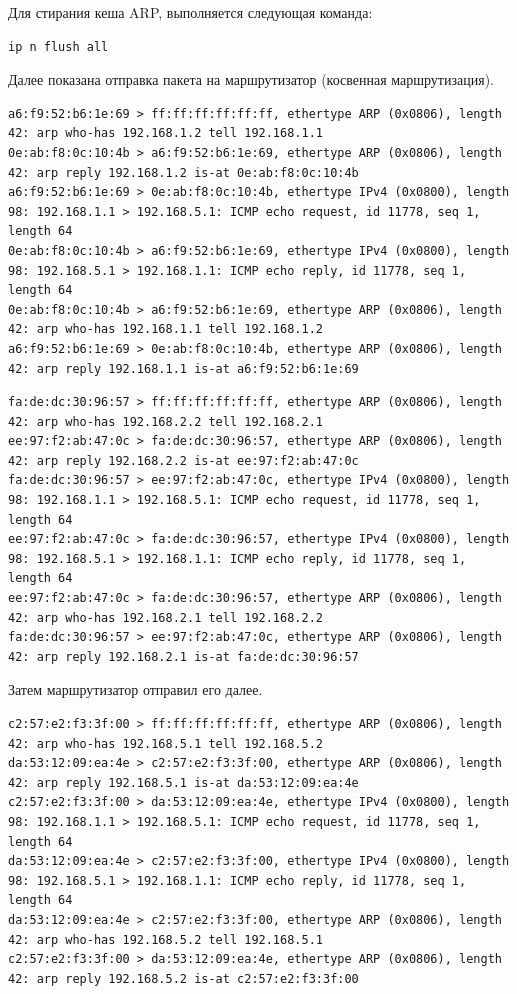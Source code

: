 \documentclass[a4paper,12pt]{article}
\begin{document}
Для стирания кеша ARP, выполняется следующая команда: 
\begin{Verbatim}
ip n flush all
\end{Verbatim}

Далее показана отправка пакета на маршрутизатор (косвенная маршрутизация). 

\begin{Verbatim}
a6:f9:52:b6:1e:69 > ff:ff:ff:ff:ff:ff, ethertype ARP (0x0806), length 42: arp who-has 192.168.1.2 tell 192.168.1.1
0e:ab:f8:0c:10:4b > a6:f9:52:b6:1e:69, ethertype ARP (0x0806), length 42: arp reply 192.168.1.2 is-at 0e:ab:f8:0c:10:4b
a6:f9:52:b6:1e:69 > 0e:ab:f8:0c:10:4b, ethertype IPv4 (0x0800), length 98: 192.168.1.1 > 192.168.5.1: ICMP echo request, id 11778, seq 1, length 64
0e:ab:f8:0c:10:4b > a6:f9:52:b6:1e:69, ethertype IPv4 (0x0800), length 98: 192.168.5.1 > 192.168.1.1: ICMP echo reply, id 11778, seq 1, length 64
0e:ab:f8:0c:10:4b > a6:f9:52:b6:1e:69, ethertype ARP (0x0806), length 42: arp who-has 192.168.1.1 tell 192.168.1.2
a6:f9:52:b6:1e:69 > 0e:ab:f8:0c:10:4b, ethertype ARP (0x0806), length 42: arp reply 192.168.1.1 is-at a6:f9:52:b6:1e:69
\end{Verbatim}

\begin{Verbatim}
fa:de:dc:30:96:57 > ff:ff:ff:ff:ff:ff, ethertype ARP (0x0806), length 42: arp who-has 192.168.2.2 tell 192.168.2.1
ee:97:f2:ab:47:0c > fa:de:dc:30:96:57, ethertype ARP (0x0806), length 42: arp reply 192.168.2.2 is-at ee:97:f2:ab:47:0c
fa:de:dc:30:96:57 > ee:97:f2:ab:47:0c, ethertype IPv4 (0x0800), length 98: 192.168.1.1 > 192.168.5.1: ICMP echo request, id 11778, seq 1, length 64
ee:97:f2:ab:47:0c > fa:de:dc:30:96:57, ethertype IPv4 (0x0800), length 98: 192.168.5.1 > 192.168.1.1: ICMP echo reply, id 11778, seq 1, length 64
ee:97:f2:ab:47:0c > fa:de:dc:30:96:57, ethertype ARP (0x0806), length 42: arp who-has 192.168.2.1 tell 192.168.2.2
fa:de:dc:30:96:57 > ee:97:f2:ab:47:0c, ethertype ARP (0x0806), length 42: arp reply 192.168.2.1 is-at fa:de:dc:30:96:57
\end{Verbatim}

Затем маршрутизатор отправил его далее.

\begin{Verbatim}
c2:57:e2:f3:3f:00 > ff:ff:ff:ff:ff:ff, ethertype ARP (0x0806), length 42: arp who-has 192.168.5.1 tell 192.168.5.2
da:53:12:09:ea:4e > c2:57:e2:f3:3f:00, ethertype ARP (0x0806), length 42: arp reply 192.168.5.1 is-at da:53:12:09:ea:4e
c2:57:e2:f3:3f:00 > da:53:12:09:ea:4e, ethertype IPv4 (0x0800), length 98: 192.168.1.1 > 192.168.5.1: ICMP echo request, id 11778, seq 1, length 64
da:53:12:09:ea:4e > c2:57:e2:f3:3f:00, ethertype IPv4 (0x0800), length 98: 192.168.5.1 > 192.168.1.1: ICMP echo reply, id 11778, seq 1, length 64
da:53:12:09:ea:4e > c2:57:e2:f3:3f:00, ethertype ARP (0x0806), length 42: arp who-has 192.168.5.2 tell 192.168.5.1
c2:57:e2:f3:3f:00 > da:53:12:09:ea:4e, ethertype ARP (0x0806), length 42: arp reply 192.168.5.2 is-at c2:57:e2:f3:3f:00
\end{Verbatim}
\end{document}

